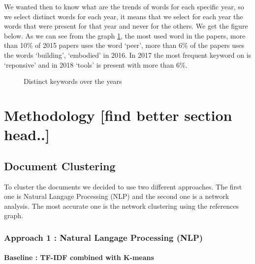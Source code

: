\documentclass[journal,twocolumn]{IEEEtran}
\begin{document}
    We wanted then to know what are the trends of words for each specific
year, so we select distinct words for each year, it means that we select
for each year the words that were present for that year and never for
the others. We get the figure below. As we can see from the graph
\ref{fig2}, the most used word in the papers, more than 10\% of 2015
papers uses the word `peer', more than 6\% of the papers uses the words
`building', `embodied' in 2016. In 2017 the most frequent keyword on is
`reponsive' and in 2018 `tools' is present with more than 6\%.


    \begin{figure}
        \begin{center}\end{center}
        \caption{Distinct keywords over the years}
        \label{fig2}
    \end{figure}
    
    \hypertarget{methodology-find-better-section-head..}{%
\section{Methodology {[}find better section
head..{]}}\label{methodology-find-better-section-head..}}

    \hypertarget{document-clustering}{%
\subsection{Document Clustering}\label{document-clustering}}

To cluster the documents we decided to use two different approaches. The
first one is Natural Langage Processing (NLP) and the second one is a
network analysis. The most accurate one is the network clustering using
the references graph.

\hypertarget{approach-1-natural-langage-processing-nlp}{%
\subsubsection{Approach 1 : Natural Langage Processing
(NLP)}\label{approach-1-natural-langage-processing-nlp}}

\hypertarget{baseline-tf-idf-combined-with-k-means}{%
\paragraph{Baseline : TF-IDF combined with
K-means}\label{baseline-tf-idf-combined-with-k-means}}
\end{document}
